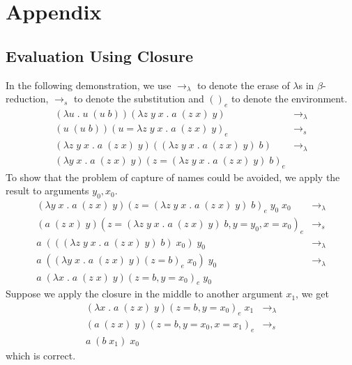 \chapter{Appendix}
\section{Evaluation Using Closure}\label{apdix:closure}
In the following demonstration, we use $\rightarrow_{\lambda}$ to denote the erase of $\lambda$s in $\beta$-reduction, $\rightarrow_s$ to denote the substitution and $()_e$ to denote the environment.
\begin{align*}
  (\lambda u \; . \; u \; (u \; b)) (\lambda z \; y \; x \; . \; a \; (z \; x) \; y) & \rightarrow_{\lambda} \\
  (u \; (u \; b)) (u = \lambda z \; y \; x \; . \; a \; (z \; x) \; y)_e & \rightarrow_s \\
  (\lambda z \; y \; x \; . \; a \; (z \; x) \; y) ((\lambda z \; y \; x \; . \; a \; (z \; x) \; y) \; b) & \rightarrow_{\lambda}\\
  (\lambda y \; x \; . \; a \; (z \; x) \; y) (z = (\lambda z \; y \; x \; . \; a \; (z \; x) \; y) \; b)_e
\end{align*}
To show that the problem of capture of names could be avoided, we apply the result to arguments $y_0, x_0$.
\begin{align*}
  (\lambda y \; x \; . \; a \; (z \; x) \; y) (z = (\lambda z \; y \; x \; . \; a \; (z \; x) \; y) \; b)_e \; y_0 \; x_0 & \rightarrow_{\lambda} \\
  (a \; (z \; x) \; y) (z = (\lambda z \; y \; x \; . \; a \; (z \; x) \; y) \; b, y = y_0, x = x_0)_e & \rightarrow_s \\
  a \; (((\lambda z \; y \; x \; . \; a \; (z \; x) \; y) \; b) \; x_0) \; y_0 & \rightarrow_{\lambda} \\
  a \; ((\lambda y \; x \; . \; a \; (z \; x) \; y) (z = b)_e \; x_0) \; y_0 & \rightarrow_{\lambda} \\
  a \; (\lambda x \; . \; a \; (z \; x) \; y) (z = b, y = x_0)_e \; y_0 & 
\end{align*}
Suppose we apply the closure in the middle to another argument $x_1$, we get
\begin{align*}
  (\lambda x \; . \; a \; (z \; x) \; y) (z = b, y = x_0)_e \; x_1 & \rightarrow_\lambda \\
  (a \; (z \; x) \; y) (z = b, y = x_0, x = x_1)_e & \rightarrow_s \\
  a \; (b \; x_1) \; x_0 &
\end{align*}
which is correct.

